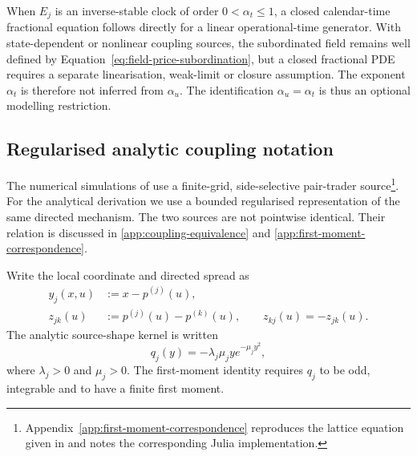 \documentclass[5p,final]{elsarticle}
\begin{document}
When $E_j$ is an inverse-stable clock of order $0<\alpha_t\leq1$, a closed calendar-time fractional equation follows directly for a linear operational-time generator. With state-dependent or nonlinear coupling sources, the subordinated field remains well defined by Equation~\eqref{eq:field-price-subordination}, but a closed fractional PDE requires a separate linearisation, weak-limit or closure assumption. The exponent $\alpha_t$ is therefore not inferred from $\alpha_u$. The identification $\alpha_u=\alpha_t$ is thus an optional modelling restriction.

\subsection{Regularised analytic coupling notation}
\label{ssec:regularised-analytic-coupling}

The numerical simulations of \citet{BauerDianaGebbie2024} use a finite-grid, side-selective pair-trader source\footnote{Appendix~\ref{app:first-moment-correspondence} reproduces the lattice equation given in \citet{BauerDianaGebbie2024} and notes the corresponding Julia implementation.}. For the analytical derivation we use a bounded regularised representation of the same directed mechanism. The two sources are not pointwise identical. Their relation is discussed in \ref{app:coupling-equivalence} and \ref{app:first-moment-correspondence}.

Write the local coordinate and directed spread as
\begin{equation}
\begin{aligned}
    y_j(x,u)&:=x-p^{(j)}(u),\\
    z_{jk}(u)&:=p^{(j)}(u)-p^{(k)}(u),
    \qquad z_{kj}(u)=-z_{jk}(u).
\end{aligned}
\end{equation}
The analytic source-shape kernel is written
\begin{equation}
    q_j(y)=-\lambda_j\mu_j ye^{-\mu_j y^2},
    \label{eq:qj-analytic}
\end{equation}
where $\lambda_j>0$ and $\mu_j>0$. The first-moment identity requires $q_j$ to be odd, integrable and to have a finite first moment.
\end{document}
